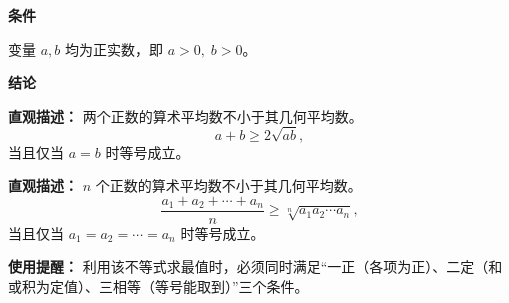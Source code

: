 \begin{statementbox}
	\textbf{\textcolor{CStatement}{条件}}
	\begin{description}[style=nextline, leftmargin=2.8em, labelsep=0.5em, itemsep=0.35em]
		\item[\textbf{\textcolor{CStatement}{条件1（正数条件）：}}] 变量 $a,b$ 均为正实数，即 $a>0,\;b>0$。
	\end{description}

	\textbf{\textcolor{CStatement}{结论}}
	\begin{description}[style=nextline, leftmargin=2.8em, labelsep=0.5em, itemsep=0.45em]
		\item[\textbf{\textcolor{CStatement}{结论一（基本不等式）：}}]
			\textbf{\textcolor{CStatement}{直观描述：}}
			两个正数的算术平均数不小于其几何平均数。
			\[
				a+b \ge 2\sqrt{ab},
			\]
			当且仅当 $a=b$ 时等号成立。

		\item[\textbf{\textcolor{CStatement}{推广结论（均值不等式）：}}]
			\textbf{\textcolor{CStatement}{直观描述：}}
			$n$ 个正数的算术平均数不小于其几何平均数。
			\[
				\frac{a_1+a_2+\cdots+a_n}{n} \ge \sqrt[n]{a_1a_2\cdots a_n},
			\]
			当且仅当 $a_1=a_2=\cdots=a_n$ 时等号成立。
	\end{description}

	\textbf{\textcolor{CStatement}{使用提醒：}}
	利用该不等式求最值时，必须同时满足“一正（各项为正）、二定（和或积为定值）、三相等（等号能取到）”三个条件。
\end{statementbox}
